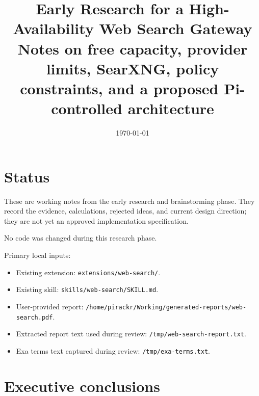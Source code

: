 \documentclass[11pt]{article}
\date{\today}
\title{Early Research for a High-Availability Web Search Gateway\\\medskip
\large Notes on free capacity, provider limits, SearXNG, policy constraints, and a proposed Pi-controlled architecture}
\begin{document}
\maketitle
\setcounter{tocdepth}{3}
\tableofcontents

\section*{Status}
\label{sec:org4750991}

These are working notes from the early research and brainstorming phase.  They
record the evidence, calculations, rejected ideas, and current design direction;
they are not yet an approved implementation specification.

No code was changed during this research phase.

Primary local inputs:

\begin{itemize}
\item Existing extension: \texttt{extensions/web-search/}.
\item Existing skill: \texttt{skills/web-search/SKILL.md}.
\item User-provided report: \texttt{/home/pirackr/Working/generated-reports/web-search.pdf}.
\item Extracted report text used during review: \texttt{/tmp/web-search-report.txt}.
\item Exa terms text captured during review: \texttt{/tmp/exa-terms.txt}.
\end{itemize}
\section*{Executive conclusions}
\label{sec:orgfb06cb1}
\end{document}
